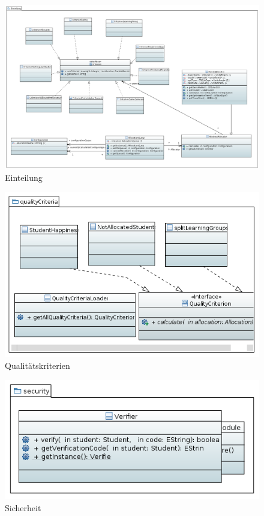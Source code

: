\documentclass[parskip=full]{scrartcl}
\begin{document}
\begin{figure}
\centering
\includegraphics[width=\linewidth]{bilder/einteilung.png}
\caption{Einteilung}
\label{uml:allocation}
\end{figure}

\begin{figure}
\centering
\includegraphics[width=\linewidth]{bilder/qualityCriteria.png}
\caption{Qualitätskriterien}
\label{uml:qualityCriteria}
\end{figure}

\begin{figure}
\centering
\includegraphics[width=\linewidth]{bilder/security.png}
\caption{Sicherheit}
\label{uml:Sicherheit}
\end{figure}
\end{document}
